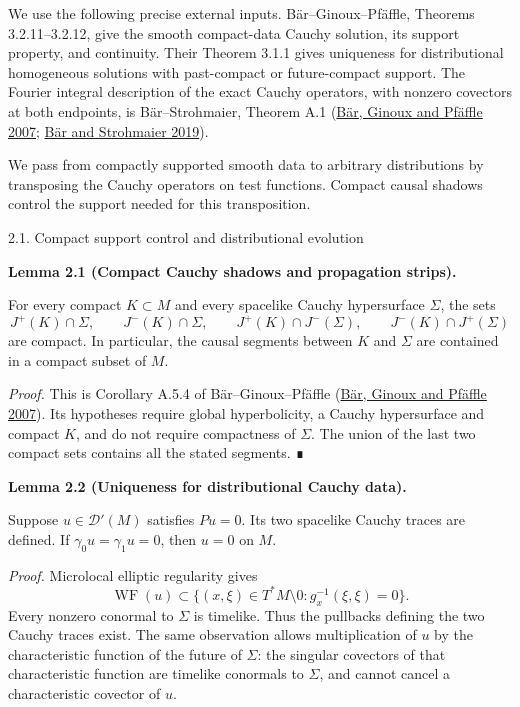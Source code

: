\documentclass[
  english,
  11pt,
  reqno]{amsart}
\makeatletter
\newcommand{\pandocstatementheading}[1]{%
  \par\addpenalty{\@beginparpenalty}%
  \addvspace{.5\baselineskip plus .2\baselineskip minus .2\baselineskip}%
  {\normalfont\bfseries #1\par}%
  \nobreak\@afterindenttrue\@afterheading
}
\newcommand{\paperstatementsection}{\@startsection{subsection}{2}%
  \z@{.5\linespacing\@plus.7\linespacing}{.35\baselineskip}%
  {\normalfont\bfseries}}
\newcommand{\paperfirststatement}[1]{%
  {\normalfont\bfseries #1\par}%
  \nobreak\@afterindenttrue\@afterheading}
\makeatother
\begin{document}
We use the following precise external inputs. Bär--Ginoux--Pfäffle,
Theorems 3.2.11--3.2.12, give the smooth compact-data Cauchy solution,
its support property, and continuity. Their Theorem 3.1.1 gives
uniqueness for distributional homogeneous solutions with past-compact or
future-compact support. The Fourier integral description of the exact
Cauchy operators, with nonzero covectors at both endpoints, is
Bär--Strohmaier, Theorem A.1 (\hyperref[ref-BarGinouxPfaeffle2007]{Bär,
Ginoux and Pfäffle 2007}; \hyperref[ref-BarStrohmaier2019]{Bär and
Strohmaier 2019}).

We pass from compactly supported smooth data to arbitrary distributions
by transposing the Cauchy operators on test functions. Compact causal
shadows control the support needed for this transposition.

\protect{}\label{sec:support-and-distributional-evolution}
\paperstatementsection{2.1. Compact support control and distributional
evolution}\label{compact-support-control-and-distributional-evolution}
\paperfirststatement{\protect{}\label{lem:compact-cauchy-shadows}Lemma 2.1 (Compact Cauchy shadows and propagation strips).}

For every compact \(K\subset M\) and every spacelike Cauchy hypersurface
\(\Sigma\), the sets \[
J^+(K)\cap\Sigma,\qquad J^-(K)\cap\Sigma,\qquad
J^+(K)\cap J^-(\Sigma),\qquad
J^-(K)\cap J^+(\Sigma)
\] are compact. In particular, the causal segments between \(K\) and
\(\Sigma\) are contained in a compact subset of \(M\).

\emph{Proof.} This is Corollary A.5.4 of Bär--Ginoux--Pfäffle
(\hyperref[ref-BarGinouxPfaeffle2007]{Bär, Ginoux and Pfäffle 2007}).
Its hypotheses require global hyperbolicity, a Cauchy hypersurface and
compact \(K\), and do not require compactness of \(\Sigma\). The union
of the last two compact sets contains all the stated segments. ∎

\pandocstatementheading{\protect{}\label{lem:distributional-zero-cauchy}Lemma 2.2 (Uniqueness for distributional Cauchy data).}

Suppose \(u\in\mathcal D'(M)\) satisfies \(Pu=0\). Its two spacelike
Cauchy traces are defined. If \(\gamma_0u=\gamma_1u=0\), then \(u=0\) on
\(M\).

\emph{Proof.} Microlocal elliptic regularity gives \[
\operatorname{WF}(u)\subset
\{(x,\xi)\in T^*M\setminus0:g^{-1}_x(\xi,\xi)=0\}.
\] Every nonzero conormal to \(\Sigma\) is timelike. Thus the pullbacks
defining the two Cauchy traces exist. The same observation allows
multiplication of \(u\) by the characteristic function of the future of
\(\Sigma\): the singular covectors of that characteristic function are
timelike conormals to \(\Sigma\), and cannot cancel a characteristic
covector of \(u\).
\end{document}

